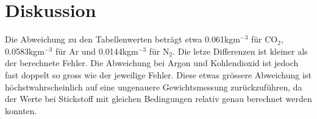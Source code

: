 \documentclass[12pt,a4paper]{article}
\begin{document}
\section*{Diskussion}
Die Abweichung zu den Tabellenwerten betr\"agt etwa 0.061kgm$^{-3}$ f\"ur CO$_2$, 0.0583kgm$^{-3}$ f\"ur Ar und 0.0144kgm$^{-3}$ f\"ur N$_2$. Die letze Differenzen ist kleiner als der berechnete Fehler. Die Abweichung bei Argon und Kohlendioxid ist jedoch fast doppelt so gross wie der jeweilige Fehler. Diese etwas gr\"ossere Abwei\-chung ist h\"ochstwahrscheinlich auf eine ungenauere Gewichtsmessung zur\"uckzuf\"uhren, da der Werte bei Stickstoff mit gleichen Bedingungen relativ genau berechnet werden konnten.
\end{document}
